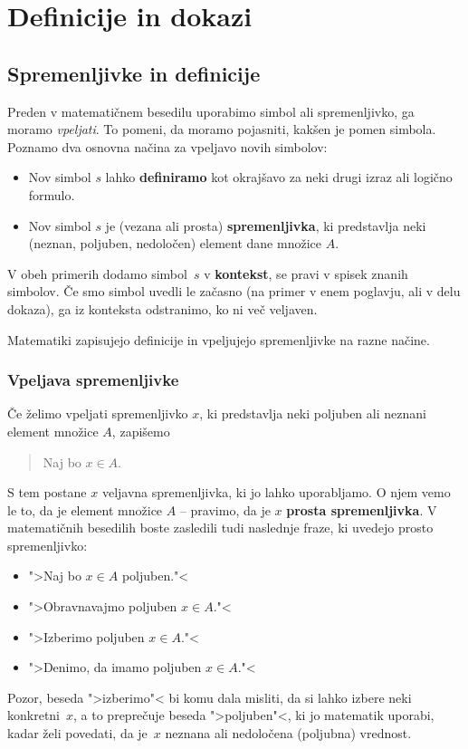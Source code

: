 \chapter{Definicije in dokazi}

\section{Spremenljivke in definicije}

Preden v matematičnem besedilu uporabimo simbol ali spremenljivko, ga moramo \emph{vpeljati}. To pomeni, da moramo pojasniti, kakšen je pomen simbola. Poznamo dva osnovna načina za vpeljavo novih simbolov:
%
\begin{itemize}
\item Nov simbol $s$ lahko \textbf{definiramo} kot okrajšavo za neki drugi izraz ali logično formulo.
\item Nov simbol $s$ je (vezana ali prosta) \textbf{spremenljivka}, ki predstavlja neki (neznan, poljuben, nedoločen) element dane množice $A$.
\end{itemize}
%
V obeh primerih dodamo simbol~$s$ v \textbf{kontekst}, se pravi v spisek znanih simbolov. Če smo simbol uvedli le začasno (na primer v enem poglavju, ali v delu dokaza), ga iz konteksta odstranimo, ko ni več veljaven.

Matematiki zapisujejo definicije in vpeljujejo spremenljivke na razne načine.

\subsection{Vpeljava spremenljivke}

Če želimo vpeljati spremenljivko $x$, ki predstavlja neki poljuben ali neznani element množice $A$, zapišemo
%
\begin{quote}
  Naj bo $x \in A$.
\end{quote}
%
S tem postane $x$ veljavna spremenljivka, ki jo lahko uporabljamo. O njem vemo le to, da je element množice $A$ -- pravimo, da je $x$ \textbf{prosta spremenljivka}. V matematičnih besedilih boste zasledili tudi naslednje fraze, ki uvedejo prosto spremenljivko:
%
\begin{itemize}
\item ">Naj bo $x \in A$ poljuben."<
\item ">Obravnavajmo poljuben $x \in A$."<
\item ">Izberimo poljuben $x \in A$."<
\item ">Denimo, da imamo poljuben $x \in A$."<
\end{itemize}
%
Pozor, beseda ">izberimo"< bi komu dala misliti, da si lahko izbere neki konkretni~$x$, a to preprečuje beseda ">poljuben"<, ki jo matematik uporabi, kadar želi povedati, da je~$x$ neznana ali nedoločena (poljubna) vrednost.

